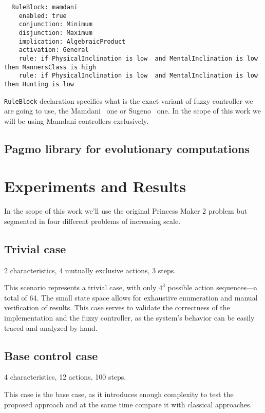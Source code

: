 \documentclass[11pt, a4paper]{article}
\begin{document}
  \begin{verbatim}
  RuleBlock: mamdani
    enabled: true
    conjunction: Minimum
    disjunction: Maximum
    implication: AlgebraicProduct
    activation: General
    rule: if PhysicalInclination is low  and MentalInclination is low    then MannersClass is high
    rule: if PhysicalInclination is low  and MentalInclination is low    then Hunting is low
  \end{verbatim}

  \texttt{RuleBlock} declaration specifies what is the exact variant of fuzzy controller we are going to use, the Mamdani~\cite{fuzzy::Mamdani} one or Sugeno~\cite{fuzzy::Sugeno} one.
  In the scope of this work we will be using Mamdani controllers exclusively.



	\subsection{Pagmo library for evolutionary computations}

	\section{Experiments and Results}

	In the scope of this work we'll use the original Princess Maker 2 problem but segmented in four different problems of increasing scale.
	
	\subsection{Trivial case}

	2 characteristics, 4 mutually exclusive actions, 3 steps.

	This scenario represents a trivial case, with only $4^{3}$ possible action sequences—a total of 64.
	The small state space allows for exhaustive enumeration and manual verification of results.
	This case serves to validate the correctness of the implementation and the fuzzy controller, as the system's behavior can be easily traced and analyzed by hand.

	\subsection{Base control case}
    
	4 characteristics, 12 actions, 100 steps.

	This case is the base case, as it introduces enough complexity to test the proposed approach and at the same time compare it with classical approaches.
\end{document}
